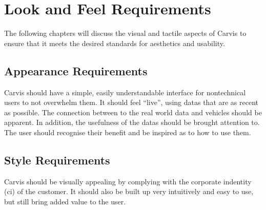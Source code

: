 \chapter{Look and Feel Requirements}
\label{chap:lookandfeel}
The following chapters will discuss the visual and tactile aspects of Carvis to ensure that it meets the desired standards for aesthetics and usability.
\section{Appearance Requirements}
Carvis should have a simple, easily understandable interface for \gls{nontechnical} users to not overwhelm them. It should feel \enquote{live}, using \glspl{data} that are as recent as possible. 
The connection between to the real world data and vehicles should be apparent. In addition, the usefulness of the \glspl{data} should be brought attention to. The user should recognise their benefit and be inspired as to how to use them.

\section{Style Requirements}
Carvis should be visually appealing by complying with the corporate indentity (\gls{ci}) of the customer.
It should also be built up very intuitively and easy to use, but still bring added value to the user.
